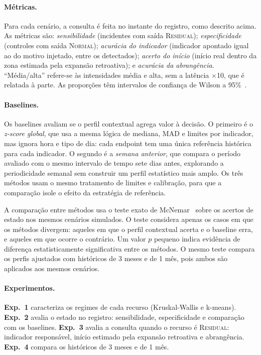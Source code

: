 \documentclass[sigconf,nonacm]{acmart}
\newcommand{\Normal}{\textsc{Normal}\xspace}
\newcommand{\Residual}{\textsc{Residual}\xspace}
\begin{document}
\paragraph{Métricas.} Para cada cenário, a consulta é feita no instante do registro, como descrito acima. As métricas são: \emph{sensibilidade} (incidentes com saída \Residual); \emph{especificidade} (controles com saída \Normal); \emph{acurácia do indicador} (indicador apontado igual ao do motivo injetado, entre os detectados); \emph{acerto do início} (início real dentro da zona estimada pela expansão retroativa); e \emph{acurácia da abrangência}. ``Média/alta'' refere-se às intensidades média e alta, sem a latência $\times$10, que é relatada à parte. As proporções têm intervalos de confiança de Wilson a 95\%~\citep{wilson1927probable}.

\paragraph{Baselines.} Os baselines avaliam se o perfil contextual agrega valor à decisão. O primeiro é o \emph{z-score global}, que usa a mesma lógica de mediana, MAD e limites por indicador, mas ignora hora e tipo de dia: cada endpoint tem uma única referência histórica para cada indicador. O segundo é a \emph{semana anterior}, que compara o período avaliado com o mesmo intervalo de tempo sete dias antes, explorando a periodicidade semanal sem construir um perfil estatístico mais amplo. Os três métodos usam o mesmo tratamento de limites e calibração, para que a comparação isole o efeito da estratégia de referência.

A comparação entre métodos usa o teste exato de McNemar~\citep{mcnemar1947note} sobre os acertos de estado nos mesmos cenários simulados. O teste considera apenas os casos em que os métodos divergem: aqueles em que o perfil contextual acerta e o baseline erra, e aqueles em que ocorre o contrário. Um valor $p$ pequeno indica evidência de diferença estatisticamente significativa entre os métodos. O mesmo teste compara os perfis ajustados com históricos de 3 meses e de 1 mês, pois ambos são aplicados aos mesmos cenários.

\paragraph{Experimentos.} \textbf{Exp.~1} caracteriza os regimes de cada recurso (Kruskal-Wallis e k-means). \textbf{Exp.~2} avalia o estado no registro: sensibilidade, especificidade e comparação com os baselines. \textbf{Exp.~3} avalia a consulta quando o recurso é \Residual: indicador responsável, início estimado pela expansão retroativa e abrangência. \textbf{Exp.~4} compara os históricos de 3 meses e de 1 mês.
\end{document}
